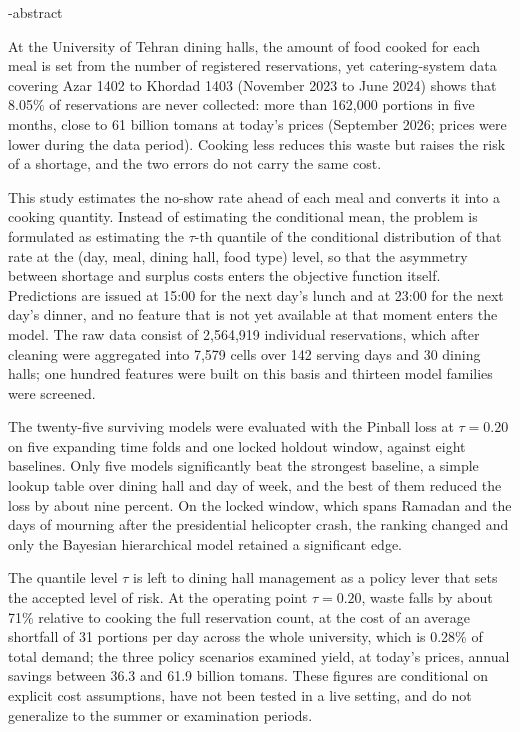 \en-abstract{
At the University of Tehran dining halls, the amount of food cooked for each meal is
set from the number of registered reservations, yet catering-system data covering Azar
1402 to Khordad 1403 (November 2023 to June 2024) shows that 8.05\% of reservations are
never collected: more than 162,000 portions in five months, close to 61 billion tomans
at today's prices (September 2026; prices were lower during the data period).
Cooking less reduces this waste but raises the risk of a shortage, and the two errors do
not carry the same cost.

This study estimates the no-show rate ahead of each meal and converts it into a cooking
quantity. Instead of estimating the conditional mean, the problem is formulated as
estimating the $\tau$-th quantile of the conditional distribution of that rate at the
(day, meal, dining hall, food type) level, so that the asymmetry between shortage and
surplus costs enters the objective function itself. Predictions are issued at 15:00 for the next day's lunch and at
23:00 for the next day's dinner, and no feature that is not yet available at that moment
enters the model. The raw data consist of 2,564,919 individual reservations, which
after cleaning were aggregated into 7,579 cells over 142 serving days and 30 dining
halls; one hundred features were built on this basis and thirteen model families were
screened.

The twenty-five surviving models were evaluated with the Pinball loss at $\tau = 0.20$
on five expanding time folds and one locked holdout window, against eight baselines.
Only five models significantly beat the strongest baseline, a simple lookup table over
dining hall and day of week, and the best of them reduced the loss by about nine
percent. On the locked window, which spans Ramadan and the days of mourning after
the presidential helicopter crash, the ranking changed and only the Bayesian
hierarchical model retained a significant edge.

The quantile level $\tau$ is left to dining hall management as a policy lever that sets
the accepted level of risk. At the operating point
$\tau = 0.20$, waste falls by about 71\% relative to cooking the full reservation
count, at the cost of an average shortfall of 31 portions per day across the whole
university, which is 0.28\% of total demand; the three policy scenarios examined yield,
at today's prices, annual savings between 36.3 and 61.9 billion tomans. These figures are
conditional on explicit cost assumptions, have not been tested in a live setting, and do
not generalize to the summer or examination periods.
}


